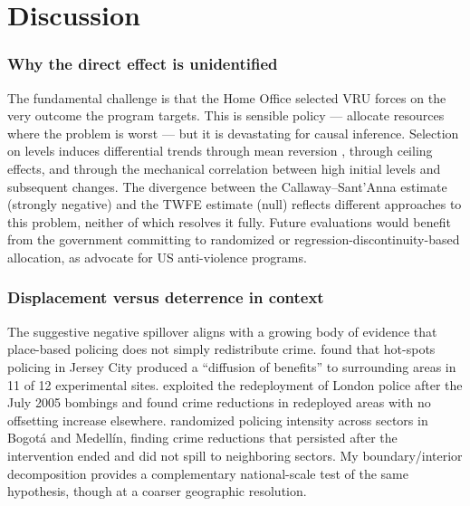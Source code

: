 \documentclass[12pt]{article}
\begin{document}



\section{Discussion}

\subsubsection*{Why the direct effect is unidentified} The fundamental challenge is that the Home Office selected VRU forces on the very outcome the program targets. This is sensible policy --- allocate resources where the problem is worst --- but it is devastating for causal inference. Selection on levels induces differential trends through mean reversion \citep{ashenfelter1978estimating}, through ceiling effects, and through the mechanical correlation between high initial levels and subsequent changes. The divergence between the Callaway--Sant'Anna estimate (strongly negative) and the TWFE estimate (null) reflects different approaches to this problem, neither of which resolves it fully. Future evaluations would benefit from the government committing to randomized or regression-discontinuity-based allocation, as \citet{heller2017thinking} advocate for US anti-violence programs.

\subsubsection*{Displacement versus deterrence in context} The suggestive negative spillover aligns with a growing body of evidence that place-based policing does not simply redistribute crime. \citet{weisburd2006displacement} found that hot-spots policing in Jersey City produced a ``diffusion of benefits'' to surrounding areas in 11 of 12 experimental sites. \citet{draca2011panic} exploited the redeployment of London police after the July 2005 bombings and found crime reductions in redeployed areas with no offsetting increase elsewhere. \citet{blattman2021place} randomized policing intensity across sectors in Bogot\'{a} and Medell\'{i}n, finding crime reductions that persisted after the intervention ended and did not spill to neighboring sectors. My boundary/interior decomposition provides a complementary national-scale test of the same hypothesis, though at a coarser geographic resolution.
\end{document}

